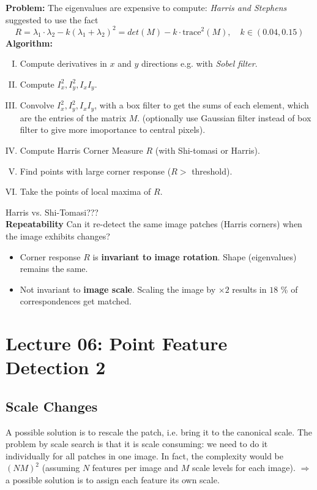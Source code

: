 \documentclass[a4paper,12 pt]{article}
\theoremstyle{definition}
\theoremstyle{remark}
\theoremstyle{definition}
\theoremstyle{definition}
\theoremstyle{definition}
\theoremstyle{remark}
\theoremstyle{definition}
\begin{document}
\textbf{Problem:} The eigenvalues are expensive to compute: \textit{Harris and Stephens} suggested to use the fact
\begin{equation}
R=\lambda_1 \cdot  \lambda_2 -k(\lambda_1+\lambda_2)^2= det(M)-k\cdot \text{trace}^2(M), \quad k\in (0.04,0.15)
\end{equation}
\textbf{Algorithm:}
\begin{enumerate}[(I)]
\item Compute derivatives in $x$ and $y$ directions e.g. with \textit{Sobel filter}.
\item Compute $I_x^2,I_y^2,I_xI_y$.
\item Convolve $I_x^2,I_y^2,I_xI_y$, with a box filter to get the sums of each element, which are the entries of the matrix $M$. (optionally use Gaussian filter instead of box filter to give more imoportance to central pixels).
\item Compute Harris Corner Measure $R$ (with Shi-tomasi or Harris).
\item Find points with large corner response ($R>$ threshold).
\item Take the points of local maxima of $R$.
\end{enumerate}
Harris vs. Shi-Tomasi??? \\
\textbf{Repeatability}
Can it re-detect the same image patches (Harris corners) when the image exhibits changes?
\begin{itemize}
\item Corner response $R$ is \textbf{invariant to image rotation}. Shape (eigenvalues) remains the same.
\item Not invariant to \textbf{image scale}. Scaling the image by $\times 2$ results in $18$ \% of correspondences get matched.
\end{itemize}
\newpage
\section*{Lecture 06: Point Feature Detection 2}
\subsection*{Scale Changes}
A possible solution is to rescale the patch, i.e. bring it to the canonical scale. The problem by scale search is that it is scale consuming: we need to do it individually for all patches in one image. In fact, the complexity would be $(NM)^2$ (assuming $N$ features per image and $M$ scale levels for each image). $\Rightarrow$ a possible solution is to assign each feature its own scale.
\end{document}
